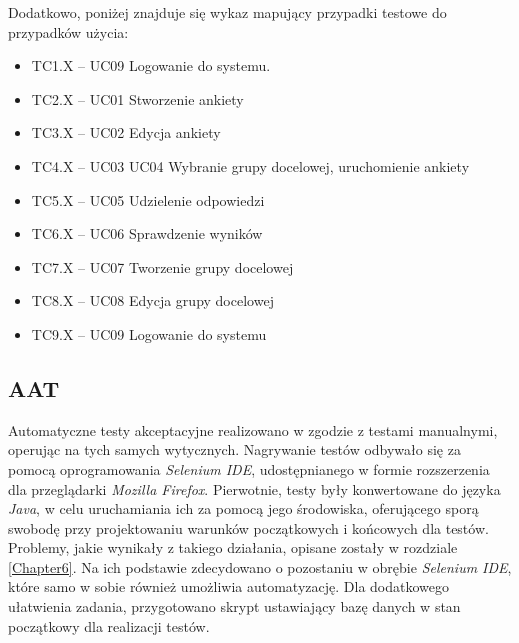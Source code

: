 \matpres
{}
\matsteps
{}
\matremark{}

Dodatkowo, poniżej znajduje się wykaz mapujący przypadki testowe do przypadków użycia:
\begin{itemize}
\item{TC1.X – UC09 Logowanie do systemu.}
\item{TC2.X – UC01 Stworzenie ankiety}
\item{TC3.X – UC02 Edycja ankiety}
\item{TC4.X – UC03 UC04 Wybranie grupy docelowej, uruchomienie ankiety}
\item{TC5.X – UC05 Udzielenie odpowiedzi}
\item{TC6.X – UC06 Sprawdzenie wyników}
\item{TC7.X – UC07 Tworzenie grupy docelowej}
\item{TC8.X – UC08 Edycja grupy docelowej}
\item{TC9.X – UC09 Logowanie do systemu}
\end{itemize}

\subsection{AAT}
\label{Chapter732}

Automatyczne testy akceptacyjne realizowano w zgodzie z testami manualnymi, operując na tych samych wytycznych. Nagrywanie testów odbywało się za pomocą oprogramowania \textit{Selenium IDE}, udostępnianego w formie rozszerzenia dla przeglądarki \textit{Mozilla Firefox}. Pierwotnie, testy były konwertowane do języka \textit{Java}, w celu uruchamiania ich za pomocą jego środowiska, oferującego sporą swobodę przy projektowaniu warunków początkowych i końcowych dla testów. Problemy, jakie wynikały z takiego działania, opisane zostały w rozdziale \ref{Chapter6}. Na ich podstawie zdecydowano o pozostaniu w obrębie \textit{Selenium IDE}, które samo w sobie również umożliwia automatyzację. Dla dodatkowego ułatwienia zadania, przygotowano skrypt ustawiający bazę danych w stan początkowy dla realizacji testów.

